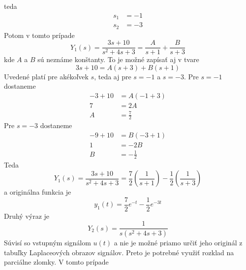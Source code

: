 \documentclass[a4paper, 10pt, ]{article}
\begin{document}
\begin{itemize}[leftmargin=0pt, labelsep=3mm, itemsep=0pt]
    teda
    \begin{subequations}
        \begin{align}
            s_1 &= -1 \\
            s_2 &= -3
        \end{align}
    \end{subequations}
    Potom v tomto prípade
    \begin{equation}
        Y_1(s) = \frac{3 s + 10}{s^2 + 4 s + 3} = \frac{A}{s + 1} + \frac{B}{s + 3}
    \end{equation}   
    kde $A$ a $B$ sú neznáme konštanty. To je možné zapísať aj v tvare
    \begin{equation}
        3 s + 10 = A (s + 3) + B (s + 1)
    \end{equation}
    Uvedené platí pre akékoľvek $s$, teda aj pre $s = -1$ a $s = -3$. Pre $s = -1$ dostaneme
    \begin{subequations}
        \begin{align}
            -3 + 10 &= A (-1 + 3) \\
            7 &= 2 A \\
            A &= \frac{7}{2}
        \end{align}
    \end{subequations}
    Pre $s = -3$ dostaneme
    \begin{subequations}
        \begin{align}
            -9 + 10 &= B (-3 + 1) \\
            1 &= -2 B \\
            B &= -\frac{1}{2}
        \end{align}
    \end{subequations}
    Teda
    \begin{equation}
        Y_1(s) = \frac{3 s + 10}{s^2 + 4 s + 3} = \frac{7}{2} \left( \frac{1}{s + 1} \right) - \frac{1}{2} \left( \frac{1}{s + 3} \right)
    \end{equation}
    a originálna funkcia je
    \begin{equation}
        y_1(t) = \frac{7}{2} e^{-t} - \frac{1}{2} e^{-3t}
    \end{equation}
    Druhý výraz je
    \begin{equation}
        Y_2(s) = \frac{1}{s(s^2 + 4 s + 3)}
    \end{equation}
    Súvisí so vstupným signálom $u(t)$ a nie je možné priamo určiť jeho originál z tabuľky Laplaceových obrazov signálov. Preto je potrebné využiť rozklad na parciálne zlomky. V tomto prípade

\end{itemize}
\end{document}
